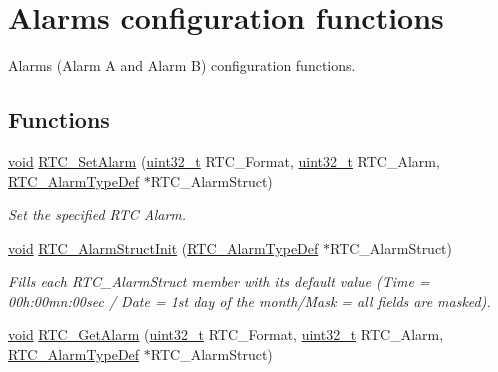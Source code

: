 \hypertarget{group___r_t_c___group3}{\section{Alarms configuration functions}
\label{group___r_t_c___group3}
}


Alarms (Alarm A and Alarm B) configuration functions.  


\subsection*{Functions}
\begin{DoxyCompactItemize}
\item 
\hyperlink{group___n_a_m_e_ga18028b8badbf1ea7e704ccac3c488e82}{void} \hyperlink{group___r_t_c___group3_ga44e3334f8e882df9b8a59b47f0857395}{R\-T\-C\-\_\-\-Set\-Alarm} (\hyperlink{stdint_8h_a435d1572bf3f880d55459d9805097f62}{uint32\-\_\-t} R\-T\-C\-\_\-\-Format, \hyperlink{stdint_8h_a435d1572bf3f880d55459d9805097f62}{uint32\-\_\-t} R\-T\-C\-\_\-\-Alarm, \hyperlink{struct_r_t_c___alarm_type_def}{R\-T\-C\-\_\-\-Alarm\-Type\-Def} $\ast$R\-T\-C\-\_\-\-Alarm\-Struct)
\begin{DoxyCompactList}\small\item\em Set the specified R\-T\-C Alarm. \end{DoxyCompactList}\item 
\hyperlink{group___n_a_m_e_ga18028b8badbf1ea7e704ccac3c488e82}{void} \hyperlink{group___r_t_c___group3_ga36ab6199e21fb415ab1ec4d7aa48ba45}{R\-T\-C\-\_\-\-Alarm\-Struct\-Init} (\hyperlink{struct_r_t_c___alarm_type_def}{R\-T\-C\-\_\-\-Alarm\-Type\-Def} $\ast$R\-T\-C\-\_\-\-Alarm\-Struct)
\begin{DoxyCompactList}\small\item\em Fills each R\-T\-C\-\_\-\-Alarm\-Struct member with its default value (Time = 00h\-:00mn\-:00sec / Date = 1st day of the month/\-Mask = all fields are masked). \end{DoxyCompactList}\item 
\hyperlink{group___n_a_m_e_ga18028b8badbf1ea7e704ccac3c488e82}{void} \hyperlink{group___r_t_c___group3_ga6e2888d2fd2e3ecb4ec50f5c955b362b}{R\-T\-C\-\_\-\-Get\-Alarm} (\hyperlink{stdint_8h_a435d1572bf3f880d55459d9805097f62}{uint32\-\_\-t} R\-T\-C\-\_\-\-Format, \hyperlink{stdint_8h_a435d1572bf3f880d55459d9805097f62}{uint32\-\_\-t} R\-T\-C\-\_\-\-Alarm, \hyperlink{struct_r_t_c___alarm_type_def}{R\-T\-C\-\_\-\-Alarm\-Type\-Def} $\ast$R\-T\-C\-\_\-\-Alarm\-Struct)

\end{DoxyCompactItemize}
